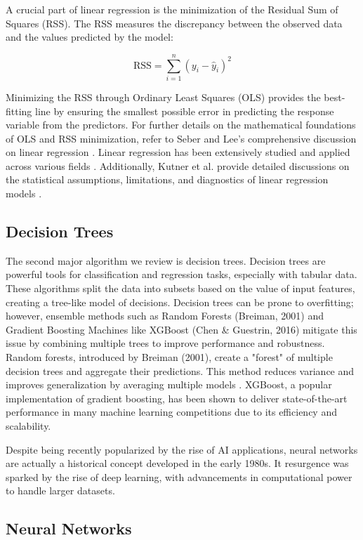 \documentclass[conference]{IEEEtran}
\begin{document}
A crucial part of linear regression is the minimization of the Residual Sum of Squares (RSS). The RSS measures the discrepancy between the observed data and the values predicted by the model:

\[
    \text{RSS} = \sum_{i=1}^n (y_i - \hat{y}_i)^2
\]

Minimizing the RSS through Ordinary Least Squares (OLS) provides the best-fitting line by ensuring the smallest possible error in predicting the response variable from the predictors. For further details on the mathematical foundations of OLS and RSS minimization, refer to Seber and Lee's comprehensive discussion on linear regression \cite{b9}. Linear regression has been extensively studied and applied across various fields \cite{b1, b2}. Additionally, Kutner et al. provide detailed discussions on the statistical assumptions, limitations, and diagnostics of linear regression models \cite{b8}.

\subsection{Decision Trees} 

The second major algorithm we review is decision trees. Decision trees are powerful tools for classification and regression tasks, especially with tabular data. These algorithms split the data into subsets based on the value of input features, creating a tree-like model of decisions. Decision trees can be prone to overfitting; however, ensemble methods such as Random Forests (Breiman, 2001) and Gradient Boosting Machines like XGBoost (Chen \& Guestrin, 2016) mitigate this issue by combining multiple trees to improve performance and robustness. Random forests, introduced by Breiman (2001), create a "forest" of multiple decision trees and aggregate their predictions. This method reduces variance and improves generalization by averaging multiple models . XGBoost, a popular implementation of gradient boosting, has been shown to deliver state-of-the-art performance in many machine learning competitions due to its efficiency and scalability.

Despite being recently popularized by the rise of AI applications, neural networks are actually a historical concept developed in the early 1980s. It resurgence was sparked by the rise of deep learning, with advancements in computational power to handle larger datasets.

\subsection{Neural Networks}
\end{document}
